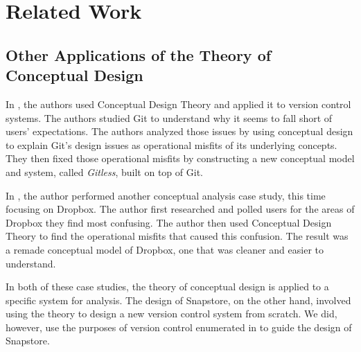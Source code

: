 \chapter{Related Work}

\section{Other Applications of the Theory of Conceptual Design}



In \cite{RossoJackson}, the authors used Conceptual Design Theory and applied it to version control systems. The authors studied Git to understand why it seems to fall short of users' expectations. The authors analyzed those issues by using conceptual design to explain Git's design issues as operational misfits of its underlying concepts. They then fixed those operational misfits by constructing a new conceptual model and system, called \textit{Gitless}, built on top of Git.

In \cite{Zhang}, the author performed another conceptual analysis case study, this time focusing on Dropbox. The author first researched and polled users for the areas of Dropbox they find most confusing. The author then used Conceptual Design Theory to find the operational misfits that caused this confusion. The result was a remade conceptual model of Dropbox, one that was cleaner and easier to understand.

In both of these case studies, the theory of conceptual design is applied to a specific system for analysis. The design of Snapstore, on the other hand, involved using the theory to design a new version control system from scratch. We did, however, use the purposes of version control enumerated in \cite{SantiagoJackson} to guide the design of Snapstore.


